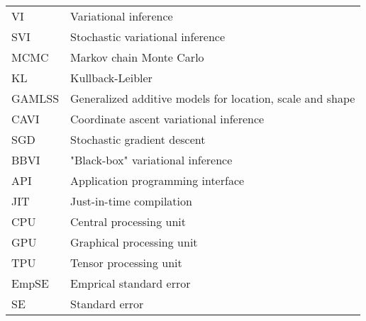\begin{tabular}{@{} l @{\hskip 1in} l}
  VI & Variational inference \\
  SVI & Stochastic variational inference \\
  MCMC & Markov chain Monte Carlo \\
  KL & Kullback-Leibler \\
  GAMLSS & Generalized additive models for location, scale and shape \\
  CAVI & Coordinate ascent variational inference \\
  SGD & Stochastic gradient descent \\
  BBVI & "Black-box" variational inference \\
  API & Application programming interface \\
  JIT & Just-in-time compilation \\
  CPU & Central processing unit \\
  GPU & Graphical processing unit \\
  TPU & Tensor processing unit \\
  EmpSE & Emprical standard error \\
  SE & Standard error \\
\end{tabular}
